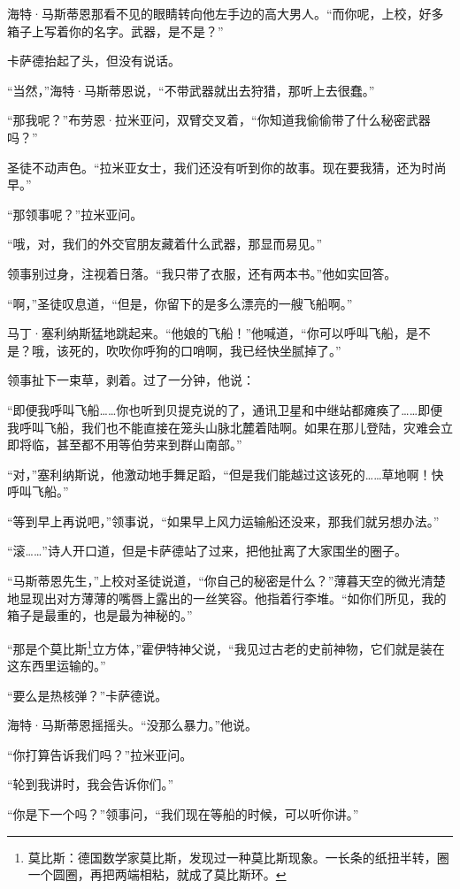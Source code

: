\documentclass[AutoFakeBold=true]{book}
\begin{document}
海特·马斯蒂恩那看不见的眼睛转向他左手边的高大男人。``而你呢，上校，好多箱子上写着你的名字。武器，是不是？''

卡萨德抬起了头，但没有说话。

``当然，''海特·马斯蒂恩说，``不带武器就出去狩猎，那听上去很蠢。''

``那我呢？''布劳恩·拉米亚问，双臂交叉着，``你知道我偷偷带了什么秘密武器吗？''

圣徒不动声色。``拉米亚女士，我们还没有听到你的故事。现在要我猜，还为时尚早。''

``那领事呢？''拉米亚问。

``哦，对，我们的外交官朋友藏着什么武器，那显而易见。''

领事别过身，注视着日落。``我只带了衣服，还有两本书。''他如实回答。

``啊，''圣徒叹息道，``但是，你留下的是多么漂亮的一艘飞船啊。''

马丁·塞利纳斯猛地跳起来。``他娘的飞船！''他喊道，``你可以呼叫飞船，是不是？哦，该死的，吹吹你呼狗的口哨啊，我已经快坐腻掉了。''

领事扯下一束草，剥着。过了一分钟，他说：

``即便我呼叫飞船……你也听到贝提克说的了，通讯卫星和中继站都瘫痪了……即便我呼叫飞船，我们也不能直接在笼头山脉北麓着陆啊。如果在那儿登陆，灾难会立即将临，甚至都不用等伯劳来到群山南部。''

``对，''塞利纳斯说，他激动地手舞足蹈，``但是我们能越过这该死的……草地啊！快呼叫飞船。''

``等到早上再说吧，''领事说，``如果早上风力运输船还没来，那我们就另想办法。''

``滚……''诗人开口道，但是卡萨德站了过来，把他扯离了大家围坐的圈子。

``马斯蒂恩先生，''上校对圣徒说道，``你自己的秘密是什么？''薄暮天空的微光清楚地显现出对方薄薄的嘴唇上露出的一丝笑容。他指着行李堆。``如你们所见，我的箱子是最重的，也是最为神秘的。''

``那是个莫比斯\footnote{莫比斯：德国数学家莫比斯，发现过一种莫比斯现象。一长条的纸扭半转，圈一个圆圈，再把两端相粘，就成了莫比斯环。}立方体，''霍伊特神父说，``我见过古老的史前神物，它们就是装在这东西里运输的。''

``要么是热核弹？''卡萨德说。

海特·马斯蒂恩摇摇头。``没那么暴力。''他说。

``你打算告诉我们吗？''拉米亚问。

``轮到我讲时，我会告诉你们。''

``你是下一个吗？''领事问，``我们现在等船的时候，可以听你讲。''
\end{document}
